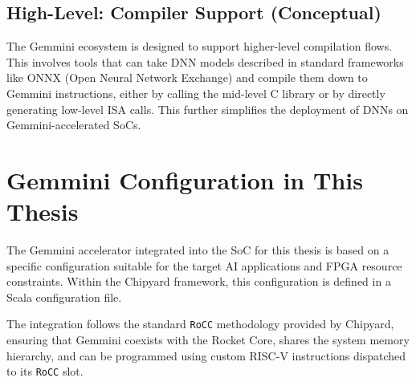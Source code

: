 \subsection{High-Level: Compiler Support (Conceptual)}
The Gemmini ecosystem is designed to support higher-level compilation flows. This involves tools that can take DNN models described in standard frameworks like ONNX (Open Neural Network Exchange) and compile them down to Gemmini instructions, either by calling the mid-level C library or by directly generating low-level ISA calls. This further simplifies the deployment of DNNs on Gemmini-accelerated SoCs.

\section{Gemmini Configuration in This Thesis}
\label{sec:gemmini_configuration}

The Gemmini accelerator integrated into the SoC for this thesis is based on a specific configuration suitable for the target AI applications and FPGA resource constraints. Within the Chipyard framework, this configuration is defined in a Scala configuration file. 

The integration follows the standard \texttt{RoCC} methodology provided by Chipyard, ensuring that Gemmini coexists with the Rocket Core, shares the system memory hierarchy, and can be programmed using custom RISC-V instructions dispatched to its \texttt{RoCC} slot.